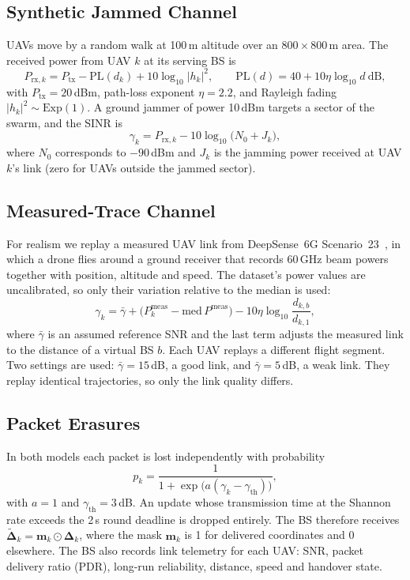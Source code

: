 \subsection{Synthetic Jammed Channel}
UAVs move by a random walk at 100\,m altitude over an $800\times800$\,m area. The
received power from UAV $k$ at its serving BS is
\begin{equation}
  P_{\mathrm{rx},k} = P_{\mathrm{tx}} - \mathrm{PL}(d_k) + 10\log_{10}|h_k|^2,
  \qquad \mathrm{PL}(d)=40+10\eta\log_{10}d \ \text{dB},
\end{equation}
with $P_{\mathrm{tx}}=20$\,dBm, path-loss exponent $\eta=2.2$, and Rayleigh fading
$|h_k|^2\sim\mathrm{Exp}(1)$. A ground jammer of power 10\,dBm targets a sector of
the swarm, and the SINR is
\begin{equation}
  \gamma_k = P_{\mathrm{rx},k} - 10\log_{10}\bigl(N_0 + J_k\bigr),
\end{equation}
where $N_0$ corresponds to $-90$\,dBm and $J_k$ is the jamming power received at
UAV $k$'s link (zero for UAVs outside the jammed sector).

\subsection{Measured-Trace Channel}
For realism we replay a measured UAV link from DeepSense~6G
Scenario~23~\cite{alkhateeb2023deepsense,charan2025drone}, in which a drone flies
around a ground receiver that records 60\,GHz beam powers together with position,
altitude and speed. The dataset's power values are uncalibrated, so only their
variation relative to the median is used:
\begin{equation}
  \gamma_k = \bar\gamma + \bigl(P^{\mathrm{meas}}_k - \mathrm{med}\,P^{\mathrm{meas}}\bigr)
  - 10\eta\log_{10}\frac{d_{k,b}}{d_{k,1}},
\end{equation}
where $\bar\gamma$ is an assumed reference SNR and the last term adjusts the measured
link to the distance of a virtual BS $b$. Each UAV replays a different flight
segment. Two settings are used: $\bar\gamma=15$\,dB, a good link, and
$\bar\gamma=5$\,dB, a weak link. They replay identical trajectories, so only the
link quality differs.

\subsection{Packet Erasures}
In both models each packet is lost independently with probability
\begin{equation}
  p_k = \frac{1}{1+\exp\bigl(a(\gamma_k-\gamma_{\mathrm{th}})\bigr)},
\end{equation}
with $a=1$ and $\gamma_{\mathrm{th}}=3$\,dB. An update whose transmission time at
the Shannon rate exceeds the 2\,s round deadline is dropped entirely. The BS
therefore receives $\tilde{\boldsymbol\Delta}_k=\mathbf{m}_k\odot\boldsymbol\Delta_k$,
where the mask $\mathbf{m}_k$ is 1 for delivered coordinates and 0 elsewhere. The BS
also records link telemetry for each UAV: SNR, packet delivery ratio (PDR), long-run
reliability, distance, speed and handover state.

